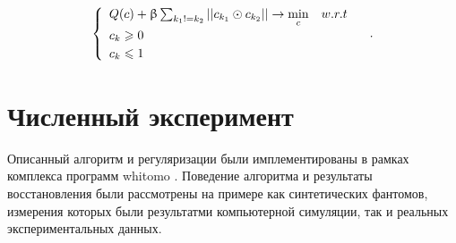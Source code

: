 \begin{equation}
\label{eq:wrm_opt}
  \begin{cases}
    \begin{array}{lc}
    Q(c) + \upbeta\sum_{k_1 != k_2}\left|\left| c_{k_1} \odot c_{k_2} \right|\right| \to \min \limits_c & w.r.t \\
    c_k \geqslant 0 & \\
    c_k \leqslant 1
    \end{array}
  \end{cases}.
\end{equation}

\section{Численный эксперимент}
Описанный алгоритм и регуляризации были имплементированы в рамках комплекса программ whitomo \cite{whitomo}.
Поведение алгоритма и результаты восстановления были рассмотрены на примере как синтетических фантомов, измерения которых были результатми компьютерной симуляции, так и реальных экспериментальных данных.


